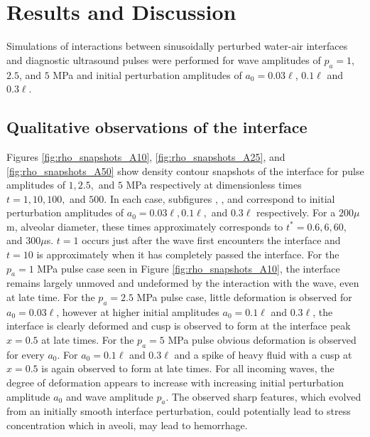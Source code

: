 \section{Results and Discussion}
Simulations of interactions between sinusoidally perturbed water-air
interfaces and diagnostic ultrasound pulses were performed for wave
amplitudes of $p_a=1$, $2.5$, and $5$ MPa and initial perturbation
amplitudes of $a_0=0.03\ell$, $0.1\ell$ and $0.3\ell$.

\subsection{Qualitative observations of the interface}
Figures \ref{fig:rho_snapshots_A10}, \ref{fig:rho_snapshots_A25}, and
\ref{fig:rho_snapshots_A50} show density contour snapshots of the
interface for pulse amplitudes of $1, 2.5,$ and $5$ MPa respectively
at dimensionless times $t=1, 10, 100,$ and $500$. In each case,
subfigures , ,
and  correspond to initial perturbation
amplitudes of $a_0=0.03\ell, 0.1\ell,$ and $0.3\ell$ respectively. For
a $200 \mu$m, alveolar diameter, these times approximately corresponds
to $t^*=0.6, 6, 60,$ and $300 \mu$s. $t=1$ occurs just after the wave
first encounters the interface and $t=10$ is approximately when it has
completely passed the interface. For the $p_a = 1$ MPa pulse case seen
in Figure \ref{fig:rho_snapshots_A10}, the interface remains largely
unmoved and undeformed by the interaction with the wave, even at late
time. For the $p_a = 2.5$ MPa pulse case, little deformation is
observed for $a_0 = 0.03\ell$, however at higher initial amplitudes
$a_0 = 0.1\ell$ and $0.3\ell$, the interface is clearly deformed and
cusp is observed to form at the interface peak $x = 0.5$ at late
times. For the $p_a = 5$ MPa pulse obvious deformation is observed for
every $a_0$. For $a_0 = 0.1\ell$ and $0.3\ell$ and a spike of heavy
fluid with a cusp at $x = 0.5$ is again observed to form at late
times.  For all incoming waves, the degree of deformation appears to
increase with increasing initial perturbation amplitude $a_0$ and wave
amplitude $p_a$. The observed sharp features, which evolved from an
initially smooth interface perturbation, could potentially lead to
stress concentration which in aveoli, may lead to hemorrhage.
%

